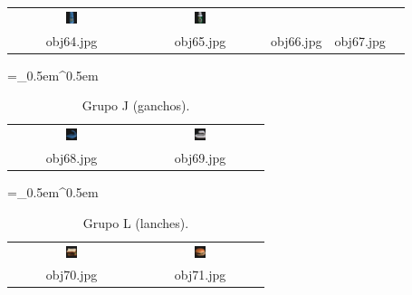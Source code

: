 \begin{table}[H]
\begin{tabu}{|ccccc|}
    \includegraphics[width=0.1\textwidth,height=0.1\textwidth]{imagens/coil_100/embalagens_tampas/obj88__0.png} &
    \includegraphics[width=0.1\textwidth,height=0.1\textwidth]{imagens/coil_100/embalagens_tampas/obj92__0.png} &
    \\
    \scriptsize{obj64.jpg} & \scriptsize{obj65.jpg} & \scriptsize{obj66.jpg} &
    \scriptsize{obj67.jpg} &
  \end{tabu}
\end{table}

\begin{table}[H]
  \centering
  \caption{Grupo J (ganchos).}
  \tabulinesep =_0.5em^0.5em
  \everyrow{\tabucline[0.4pt]-}
  \begin{tabu}{|cc|}
    \includegraphics[width=0.1\textwidth,height=0.1\textwidth]{imagens/coil_100/ganchos/obj36__0.png} &
    \includegraphics[width=0.1\textwidth,height=0.1\textwidth]{imagens/coil_100/ganchos/obj85__0.png}
    \\
    \scriptsize{obj68.jpg} & \scriptsize{obj69.jpg}
  \end{tabu}
\end{table}

\begin{table}[H]
  \centering
  \caption{Grupo L (lanches).}
  \tabulinesep =_0.5em^0.5em
  \everyrow{\tabucline[0.4pt]-}
  \begin{tabu}{|cc|}
    \includegraphics[width=0.1\textwidth,height=0.1\textwidth]{imagens/coil_100/lanches/obj53__0.png} &
    \includegraphics[width=0.1\textwidth,height=0.1\textwidth]{imagens/coil_100/lanches/obj73__0.png}
    \\
    \scriptsize{obj70.jpg} & \scriptsize{obj71.jpg}
  \end{tabu}
\end{table}

